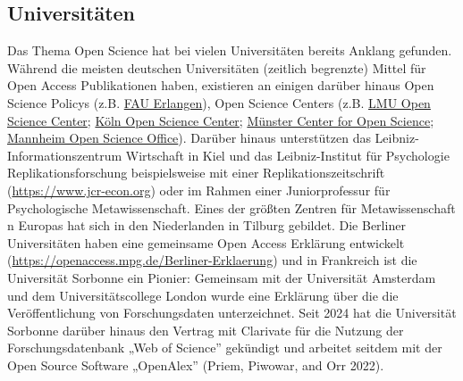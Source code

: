 \documentclass[
  letterpaper,
  DIV=11,
  numbers=noendperiod]{scrreprt}
\begin{document}
\subsection{Universitäten}\label{universituxe4ten}

\begin{tcolorbox}[enhanced jigsaw, left=2mm, colback=white, colframe=quarto-callout-note-color-frame, opacitybacktitle=0.6, opacityback=0, title=\textcolor{quarto-callout-note-color}{\faInfo}\hspace{0.5em}{Welche Universitäten tun etwas? (Beispiele)}, toptitle=1mm, coltitle=black, colbacktitle=quarto-callout-note-color!10!white, titlerule=0mm, bottomtitle=1mm, leftrule=.75mm, breakable, rightrule=.15mm, bottomrule=.15mm, toprule=.15mm, arc=.35mm]

Das Thema Open Science hat bei vielen Universitäten bereits Anklang
gefunden. Während die meisten deutschen Universitäten (zeitlich
begrenzte) Mittel für Open Access Publikationen haben, existieren an
einigen darüber hinaus Open Science Policys (z.B.
\href{https://oa-info.sh/2022/01/open-science-policy-der-uni-erlangen-nuernberg/}{FAU
Erlangen}), Open Science Centers (z.B.
\href{https://www.osc.uni-muenchen.de/index.html}{LMU Open Science
Center}; \href{https://oscc.uni-koeln.de/home}{Köln Open Science
Center}; \href{https://www.uni-muenster.de/MueCOS/}{Münster Center for
Open Science};
\href{https://www.uni-mannheim.de/open-science/open-science-office/}{Mannheim
Open Science Office}). Darüber hinaus unterstützen das
Leibniz-Informationszentrum Wirtschaft in Kiel und das Leibniz-Institut
für Psychologie Replikationsforschung beispielsweise mit einer
Replikationszeitschrift (\url{https://www.jcr-econ.org}) oder im Rahmen
einer Juniorprofessur für Psychologische Metawissenschaft. Eines der
größten Zentren für Metawissenschaft n Europas hat sich in den
Niederlanden in Tilburg gebildet. Die Berliner Universitäten haben eine
gemeinsame Open Access Erklärung entwickelt
(\url{https://openaccess.mpg.de/Berliner-Erklaerung}) und in Frankreich
ist die Universität Sorbonne ein Pionier: Gemeinsam mit der Universität
Amsterdam und dem Universitätscollege London wurde eine Erklärung über
die die Veröffentlichung von Forschungsdaten unterzeichnet. Seit 2024
hat die Universität Sorbonne darüber hinaus den Vertrag mit Clarivate
für die Nutzung der Forschungsdatenbank „Web of Science'' gekündigt und
arbeitet seitdem mit der Open Source Software „OpenAlex'' (Priem,
Piwowar, and Orr 2022).

\end{tcolorbox}
\end{document}
